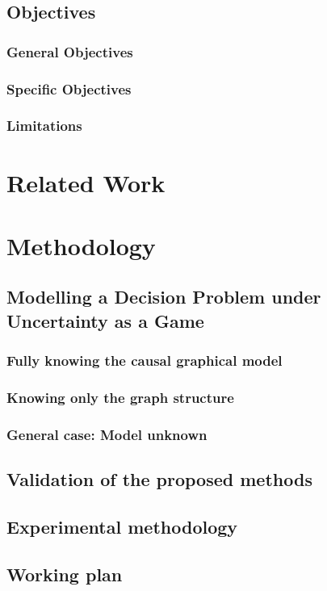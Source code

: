 \documentclass[11pt]{article}
\theoremstyle{plain}
\begin{document}
	\subsection{Objectives}
		\subsubsection{General Objectives}
		\subsubsection{Specific Objectives}
		\subsubsection{Limitations}

\newpage
\section{Related Work}

\newpage
\section{Methodology}
\subsection{Modelling a Decision Problem under Uncertainty as a Game}
\subsubsection{Fully knowing the causal graphical model}
\subsubsection{Knowing only the graph structure}
\subsubsection{General case: Model unknown}
\subsection{Validation of the proposed methods}
\subsection{Experimental methodology}
\subsection{Working plan}
\end{document}

